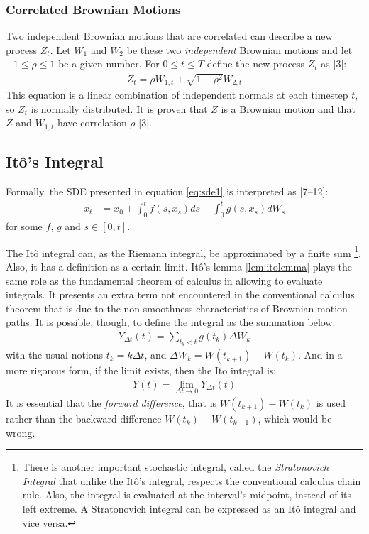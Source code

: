 \documentclass[12pt,oneside]{reedthesis}
\theoremstyle{definition}
\theoremstyle{definition}
\theoremstyle{remark}
\begin{document}
  \subsubsection{Correlated Brownian Motions}\label{corr}
  
  Two independent Brownian motions that are correlated can describe a new
  process \(Z_t\). Let \(W_1\) and \(W_2\) be these two \emph{independent}
  Brownian motions and let \(-1 \leq \rho \leq 1\) be a given number. For
  \(0 \leq t \leq T\) define the new process \(Z_t\) as {[}3{]}:
  \begin{align}
  \label{eq:corr_brow}
  Z_t = \rho W_{1,t} + \sqrt{1-\rho^2}W_{2,t}
  \end{align}
  \noindent
  This equation is a linear combination of independent normals at each
  timestep \(t\), so \(Z_t\) is normally distributed. It is proven that
  \(Z\) is a Brownian motion and that \(Z\) and \(W_{1,t}\) have
  correlation \(\rho\) {[}3{]}.
  
  \subsection{Itô's Integral}\label{itos-integral}
  
  Formally, the SDE presented in equation \eqref{eq:sde1} is interpreted as
  {[}7--12{]}:
  \begin{align} 
  \label{eq:sde2}
  x_t &= x_0 + \int_{0}^{t}{f(s, x_s)ds} + \int_{0}^{t}{g(s, x_s)dW_s}
  \end{align}
  \noindent
  for some \(f\), \(g\) and \(s \in [0,t]\).
  
  The Itô integral can, as the Riemann integral, be approximated by a
  finite sum
  \footnote{There is another important stochastic integral, called the \textit{Stratonovich Integral} that unlike the Itô's integral, respects the conventional calculus chain rule. Also, the integral is evaluated at the interval's midpoint, instead of its left extreme. A Stratonovich integral can be expressed as an Itô integral and vice versa.}.
  Also, it has a definition as a certain limit. Itô's lemma
  \ref{lem:itolemma} plays the same role as the fundamental theorem of
  calculus in allowing to evaluate integrals. It presents an extra term
  not encountered in the conventional calculus theorem that is due to the
  non-smoothness characteristics of Brownian motion paths. It is possible,
  though, to define the integral as the summation below:
  \begin{align}
  Y_{\Delta t}(t) = \sum_{t_k < t}{g(t_k)\Delta W_k}
  \end{align}
  \noindent
  with the usual notions \(t_k = k\Delta t\), and
  \(\Delta W_k = W(t_{k+1})-W(t_k)\). And in a more rigorous form, if the
  limit exists, then the Ito integral is:
  \begin{align}
  Y(t)  = \lim\limits_{\Delta t \to 0} Y_{\Delta t}(t)
  \end{align}
  It is essential that the \emph{forward difference}, that is
  \(W(t_{k+1})-W(t_k)\) is used rather than the backward difference
  \(W(t_{k})-W(t_{k-1})\), which would be wrong.
  
\end{document}
